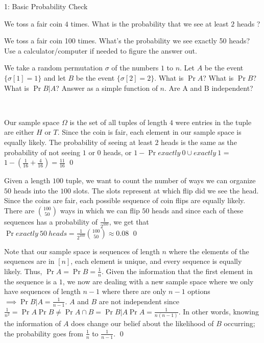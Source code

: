 \documentclass[12pt]{article}
\begin{document}

\begin{problem}{1: Basic Probability Check}\
\begin{subprob}
    \item We toss a fair coin $4$ times. What is the probability that we see at least $2$ heads ?
    \item We toss a fair coin 100 times. What’s the probability we see exactly 50 heads? Use a calculator/computer if needed to figure the answer out.
    \item We take a random permutation $\sigma$ of the numbers $1$ to $n$. Let $A$ be the event $\{\sigma[1] = 1\}$ and let $B$ be the event $\{\sigma[2] = 2\}$. What is $\Pr{A}$? What is $\Pr{B}$? What is $\Pr{B | A}$? Answer as a simple function of $n$. Are A and B independent?
\end{subprob}
\end{problem}

\begin{solution} \
\begin{subprob}
    \item Our sample space $\Omega$ is the set of all tuples of length $4$ were entries in the tuple are either $H$ or $T$. Since the coin is fair, each element in our sample space is equally likely. The probability of seeing at least $2$ heads is the same as the probability of not seeing $1$ or $0$ heads, or $1 - \Pr{exactly ~0 \cup exactly ~1}$ = $1 - (\frac{1}{16} + \frac{4}{16}) = \frac{11}{16}$ \qed
    \item Given a length $100$ tuple, we want to count the number of ways we can organize $50$ heads into the $100$ slots. The slots represent at which flip did we see the head. Since the coins are fair, each possible sequence of coin flips are equally likely. There are $\binom{100}{50}$ ways in which we can flip $50$ heads and since each of these sequences has a probability of $\frac{1}{2^{100}}$, we get that $\Pr{exactly ~50~ heads} =\frac{1}{2^{100}}\binom{100}{50} \approx 0.08$ \qed
    \item Note that our sample space is sequences of length $n$ where the elements of the sequences are in $[n]$, each element is unique, and every sequence is equally likely. Thus, $\Pr{A} = \Pr{B} = \frac{1}{n}$. Given the information that the first element in the sequence is a $1$, we now are dealing with a new sample space where we only have sequences of length $n-1$ where there are only $n-1$ options $\implies \Pr{B|A} = \frac{1}{n-1}$. $A$ and $B$ are not independent since $\frac{1}{n^2} = \Pr{A}\Pr{B} \neq \Pr{A\cap B} = \Pr{B|A}\Pr{A} = \frac{1}{n(n-1)}$. In other words, knowing the information of $A$ does change our belief about the likelihood of $B$ occurring; the probability goes from $\frac{1}{n}$ to $\frac{1}{n-1}$. \qed
\end{subprob}
\end{solution}
\end{document}

